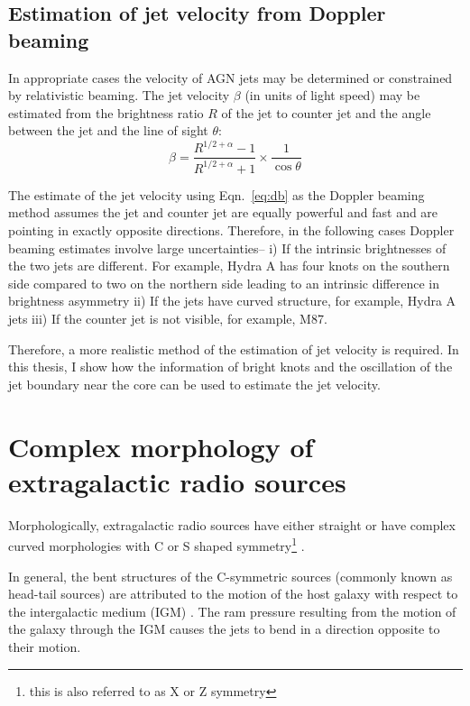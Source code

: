 \subsection{Estimation of jet velocity from Doppler beaming}
In appropriate cases the velocity of AGN jets may be determined or constrained by relativistic beaming.  The jet velocity $\beta$ (in units of light speed) may be estimated from the brightness ratio $R$ of the jet to counter jet and the angle between the jet and the line of sight $\theta$:
\begin{equation}
\beta = \frac{R^{1/2+\alpha}-1}{R^{1/2+\alpha}+1}\times \frac{1}{\cos \theta}
\label{eq:db}
\end{equation}

The estimate of the jet velocity using Eqn.~\eqref{eq:db} as the Doppler beaming method assumes the jet and counter jet are equally powerful and fast and are pointing in exactly opposite directions. Therefore, in the following cases Doppler beaming estimates involve large uncertainties-- i) If the intrinsic brightnesses of the two jets are different. For example, Hydra A has four knots on the southern side compared to two on the northern side leading to an intrinsic difference in brightness asymmetry ii) If the jets have curved structure, for example, Hydra A jets iii) If the counter jet is not visible, for example, M87. 

Therefore, a more realistic method of the estimation of jet velocity is required. In this thesis, I show how the information of bright knots and the oscillation of the jet boundary near the core can be used to estimate the jet velocity. 


\section{Complex morphology of extragalactic radio sources}
Morphologically, extragalactic radio sources have either straight or have complex curved morphologies with C or S shaped symmetry\footnote{this is also referred to as X or Z symmetry} \citep{zaninetti88}. 

In general, the bent structures of the C-symmetric sources (commonly known as head-tail sources) are attributed to the motion of the host galaxy with respect to the intergalactic medium (IGM) \citep{begelman84, morsony13}. The ram pressure resulting from the motion of the galaxy through the IGM causes the jets to bend in a direction opposite to their motion. 

